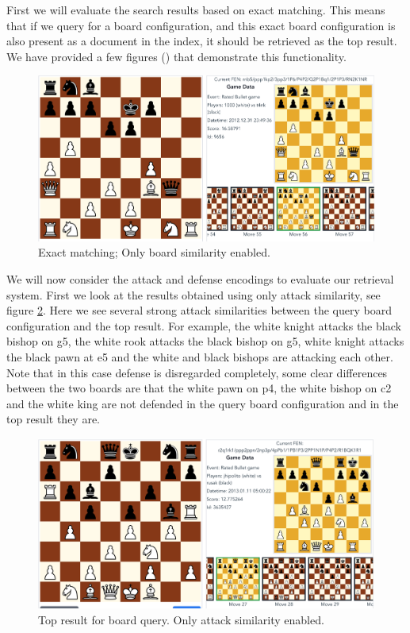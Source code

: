 \documentclass[11pt]{article}
\begin{document}
    First we will evaluate the search results based on exact matching. This means that if we query for a board configuration, and this exact board configuration is also present as a document in the index, it should be retrieved as the top result. We have provided a few figures () that demonstrate this functionality.

    \begin{figure}[H]
        \centering
        \includegraphics[width=12cm]{images/ExactMatch1-Bo}
        \caption{Exact matching; Only board similarity enabled.}
        \label{fig:ExactMatch1-Bo}
    \end{figure}

    We will now consider the attack and defense encodings to evaluate our retrieval system. First we look at the results obtained using only attack similarity, see figure \ref{fig:Attack}.
    Here we see several strong attack similarities between the query board configuration and the top result. For example, the white knight attacks the black bishop on g5, the white rook attacks the black bishop on g5, white knight attacks the black pawn at e5 and the white and black bishops are attacking each other.
    Note that in this case defense is disregarded completely, some clear differences between the two boards are that the white pawn on p4, the white bishop on c2 and the white king are not defended in the query board configuration and in the top result they are.

    \begin{figure}[H]
        \centering
        \includegraphics[width=12cm]{images/Attack}
        \caption{Top result for board query. Only attack similarity enabled.}
        \label{fig:Attack}
    \end{figure}
\end{document}
